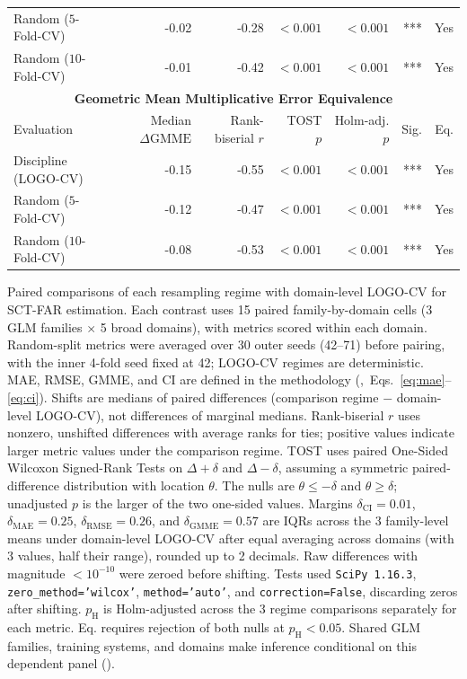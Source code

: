 \documentclass{article}
\begin{document}
\begin{table}[H]
\begin{tabularx}{\linewidth}{@{}Xrrrrrr@{}}
Random ($5$-Fold-CV) & -0.02 & -0.28 & $<0.001$ & $<0.001$ & *** & Yes \\
Random ($10$-Fold-CV) & -0.01 & -0.42 & $<0.001$ & $<0.001$ & *** & Yes \\
\midrule
\multicolumn{7}{c}{\textbf{Geometric Mean Multiplicative Error Equivalence}} \\
\cmidrule(lr){1-7}
Evaluation & \shortstack{Median\\$\Delta\mathrm{GMME}$} & \shortstack{Rank-biserial\\$r$} & \shortstack{TOST\\$p$} & \shortstack{Holm-adj.\\$p$} & Sig. & Eq. \\
\midrule
Discipline (LOGO-CV) & -0.15 & -0.55 & $<0.001$ & $<0.001$ & *** & Yes \\
Random ($5$-Fold-CV) & -0.12 & -0.47 & $<0.001$ & $<0.001$ & *** & Yes \\
Random ($10$-Fold-CV) & -0.08 & -0.53 & $<0.001$ & $<0.001$ & *** & Yes \\
\bottomrule
\end{tabularx}
\par\vspace{12pt}
\begin{minipage}{\linewidth}
\footnotesize
Paired comparisons of each resampling regime with domain-level LOGO-CV for SCT-FAR estimation. Each contrast uses 15 paired family-by-domain cells (3 GLM families $\times$ 5 broad domains), with metrics scored within each domain. Random-split metrics were averaged over 30 outer seeds (42--71) before pairing, with the inner 4-fold seed fixed at 42; LOGO-CV regimes are deterministic. MAE, RMSE, GMME, and CI are defined in the methodology (,~Eqs.~\eqref{eq:mae}--\eqref{eq:ci}). Shifts are medians of paired differences (comparison regime $-$ domain-level LOGO-CV), not differences of marginal medians. Rank-biserial $r$ uses nonzero, unshifted differences with average ranks for ties; positive values indicate larger metric values under the comparison regime. TOST uses paired One-Sided Wilcoxon Signed-Rank Tests on $\Delta+\delta$ and $\Delta-\delta$, assuming a symmetric paired-difference distribution with location $\theta$. The nulls are $\theta\leq-\delta$ and $\theta\geq\delta$; unadjusted $p$ is the larger of the two one-sided values. Margins $\delta_{\mathrm{CI}} = 0.01$, $\delta_{\mathrm{MAE}} = 0.25$, $\delta_{\mathrm{RMSE}} = 0.26$, and $\delta_{\mathrm{GMME}} = 0.57$ are IQRs across the 3 family-level means under domain-level LOGO-CV after equal averaging across domains (with 3 values, half their range), rounded up to 2 decimals. Raw differences with magnitude $<10^{-10}$ were zeroed before shifting. Tests used \texttt{SciPy 1.16.3}, \texttt{zero\_method='wilcox'}, \texttt{method='auto'}, and \texttt{correction=False}, discarding zeros after shifting. $p_{\mathrm H}$ is Holm-adjusted across the 3 regime comparisons separately for each metric. Eq. requires rejection of both nulls at $p_{\mathrm H}<0.05$. Shared GLM families, training systems, and domains make inference conditional on this dependent panel ().

\end{minipage}
\end{table}
\end{document}
